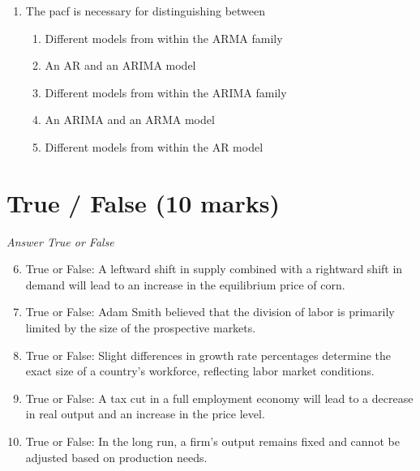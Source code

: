 \documentclass[12pt]{article}
\begin{document}
\begin{enumerate}[label=\arabic*.]
\begin{enumerate}[label=(\alph*)]
    \item calls for the federal government to run a deficit.
    \item calls for the federal government to run a surplus.
    \item is increased taxes and government spending.
    \item is decreased government spending and taxes.
\end{enumerate}
\item The pacf is necessary for distinguishing between
\begin{enumerate}[label=(\alph*)]
    \item Different models from within the ARMA family
    \item An AR and an ARIMA model
    \item Different models from within the ARIMA family
    \item An ARIMA and an ARMA model
    \item Different models from within the AR model
\end{enumerate}
\end{enumerate}

\section*{True / False (10 marks)}
\textit{Answer True or False}
\begin{enumerate}[label=\arabic*.]
\setcounter{enumi}{5}
\item True or False: A leftward shift in supply combined with a rightward shift in demand will lead to an increase in the equilibrium price of corn.
\item True or False: Adam Smith believed that the division of labor is primarily limited by the size of the prospective markets.
\item True or False: Slight differences in growth rate percentages determine the exact size of a country's workforce, reflecting labor market conditions.
\item True or False: A tax cut in a full employment economy will lead to a decrease in real output and an increase in the price level.
\item True or False: In the long run, a firm's output remains fixed and cannot be adjusted based on production needs.
\end{enumerate}
\end{document}

